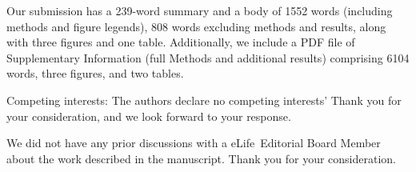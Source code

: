 \documentclass[stdletter,8pt,dateno]{newlfm}%
\newcommand{\Journal}{eLife}%
\begin{document}
\begin{newlfm}
Our submission has a 239-word summary and a body of 1552 words
(including methods and figure legends), 808 words excluding methods and results, along with three figures and one table.
Additionally, we include a PDF file of Supplementary Information
(full Methods and additional results) comprising 6104 words, three figures, and two tables.

Competing interests: The authors declare no competing interests’
Thank you for your consideration, and we look forward to your response.

We did not have any prior discussions with
a \Journal\ Editorial Board Member
about the work described in the manuscript.
Thank you for your consideration.%

\end{newlfm}
\end{document}
